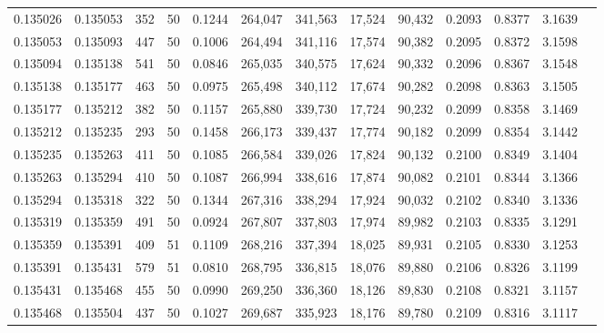 \begin{tabular}{rrrrrrrrrrrrr}
0.135026 & 0.135053 &   352 &  50 &                                     0.1244 & 264,047 & 341,563 &  17,524 &  90,432 & 0.2093 & 0.8377 & 3.1639 \\
0.135053 & 0.135093 &   447 &  50 &                                     0.1006 & 264,494 & 341,116 &  17,574 &  90,382 & 0.2095 & 0.8372 & 3.1598 \\
0.135094 & 0.135138 &   541 &  50 &                                     0.0846 & 265,035 & 340,575 &  17,624 &  90,332 & 0.2096 & 0.8367 & 3.1548 \\
0.135138 & 0.135177 &   463 &  50 &                                     0.0975 & 265,498 & 340,112 &  17,674 &  90,282 & 0.2098 & 0.8363 & 3.1505 \\
0.135177 & 0.135212 &   382 &  50 &                                     0.1157 & 265,880 & 339,730 &  17,724 &  90,232 & 0.2099 & 0.8358 & 3.1469 \\
0.135212 & 0.135235 &   293 &  50 &                                     0.1458 & 266,173 & 339,437 &  17,774 &  90,182 & 0.2099 & 0.8354 & 3.1442 \\
0.135235 & 0.135263 &   411 &  50 &                                     0.1085 & 266,584 & 339,026 &  17,824 &  90,132 & 0.2100 & 0.8349 & 3.1404 \\
0.135263 & 0.135294 &   410 &  50 &                                     0.1087 & 266,994 & 338,616 &  17,874 &  90,082 & 0.2101 & 0.8344 & 3.1366 \\
0.135294 & 0.135318 &   322 &  50 &                                     0.1344 & 267,316 & 338,294 &  17,924 &  90,032 & 0.2102 & 0.8340 & 3.1336 \\
0.135319 & 0.135359 &   491 &  50 &                                     0.0924 & 267,807 & 337,803 &  17,974 &  89,982 & 0.2103 & 0.8335 & 3.1291 \\
0.135359 & 0.135391 &   409 &  51 &                                     0.1109 & 268,216 & 337,394 &  18,025 &  89,931 & 0.2105 & 0.8330 & 3.1253 \\
0.135391 & 0.135431 &   579 &  51 &                                     0.0810 & 268,795 & 336,815 &  18,076 &  89,880 & 0.2106 & 0.8326 & 3.1199 \\
0.135431 & 0.135468 &   455 &  50 &                                     0.0990 & 269,250 & 336,360 &  18,126 &  89,830 & 0.2108 & 0.8321 & 3.1157 \\
0.135468 & 0.135504 &   437 &  50 &                                     0.1027 & 269,687 & 335,923 &  18,176 &  89,780 & 0.2109 & 0.8316 & 3.1117 \\

\end{tabular}
